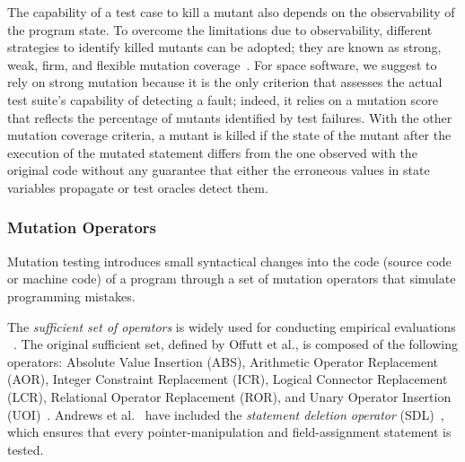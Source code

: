 The capability of a test case to kill a mutant also depends on the observability of the program state. To overcome the limitations due to observability, different strategies to identify killed mutants can be adopted; they are known as strong, weak, firm, and flexible mutation coverage~\cite{ammann2016introduction}. For space software, we suggest to rely on strong mutation because it is the only criterion that assesses the actual test suite's capability of detecting a fault; indeed, it relies on a mutation score that reflects the percentage of mutants identified by test failures. With the other mutation coverage criteria, a mutant is killed if the state of the mutant after the execution of the mutated statement differs from the one observed with the original code without any guarantee that either the erroneous values in state variables propagate or test oracles detect them. 




\subsubsection{Mutation Operators}
\label{sec:related:operators}

%


Mutation testing introduces small syntactical changes into the code (source code or machine code) of a program through a set of mutation operators that simulate programming mistakes. 

The  \emph{sufficient set of operators} is widely used for conducting empirical evaluations ~\cite{offutt1996experimental,rothermel1996experimental,andrews2005mutation,kintis2017detecting}. 
The original sufficient set, defined by Offutt et al., is composed of the following operators: Absolute Value Insertion (ABS), Arithmetic Operator Replacement (AOR), Integer Constraint Replacement (ICR), Logical Connector Replacement (LCR), Relational Operator Replacement (ROR), and Unary Operator Insertion (UOI)~\cite{offutt1996experimental}.
Andrews et al.~\cite{andrews2005mutation} have included the 
\emph{statement deletion operator} (SDL)~\cite{delamaro2014designing}, which ensures that every pointer-manipulation and field-assignment statement is tested. 

